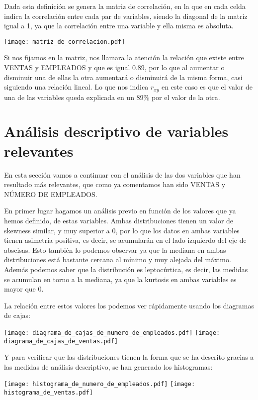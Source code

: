 \documentclass{article}
\begin{document}
Dada esta definición se genera la matriz de correlación, en la que en cada celda indica la correlación entre cada par de variables, siendo la diagonal de la matriz igual a 1, ya que la correlación entre una variable y ella misma es absoluta.

\texttt{[image: matriz\_de\_correlacion.pdf]}
\FloatBarrier

Si nos fijamos en la matriz, nos llamara la atención la relación que existe entre VENTAS y EMPLEADOS y que es igual 0.89, por lo que al aumentar o disminuir una de ellas la otra aumentará o disminuirá de la misma forma, casi siguiendo una relación lineal. Lo que nos indica $r_{xy}$ en este caso es que el valor de una de las variables queda explicada en un 89\% por el valor de la otra.

\section{Análisis descriptivo de variables relevantes}

En esta sección vamos a continuar con el análisis de las dos variables que han resultado más relevantes, que como ya comentamos han sido VENTAS y NÚMERO DE EMPLEADOS.

En primer lugar hagamos un análisis previo en función de los valores que ya hemos definido, de estas variables. Ambas distribuciones tienen un valor de skewness similar, y muy superior a 0, por lo que los datos en ambas variables tienen asimetría positiva, es decir, se acumularán en el lado izquierdo del eje de abscisas. Esto también lo podemos observar ya que la mediana en ambas distribuciones está bastante cercana al mínimo y muy alejada del máximo. Además podemos saber que la distribución es leptocúrtica, es decir, las medidas se acumulan en torno a la mediana, ya que la kurtosis en ambas variables es mayor que 0.

La relación entre estos valores los podemos ver rápidamente usando los diagramas de cajas:

\texttt{[image: diagrama\_de\_cajas\_de\_numero\_de\_empleados.pdf]}
\texttt{[image: diagrama\_de\_cajas\_de\_ventas.pdf]}
\FloatBarrier

Y para verificar que las distribuciones tienen la forma que se ha descrito gracias a las medidas de análisis descriptivo, se han generado los histogramas:

\texttt{[image: histograma\_de\_numero\_de\_empleados.pdf]}
\texttt{[image: histograma\_de\_ventas.pdf]}
\FloatBarrier
\end{document}
